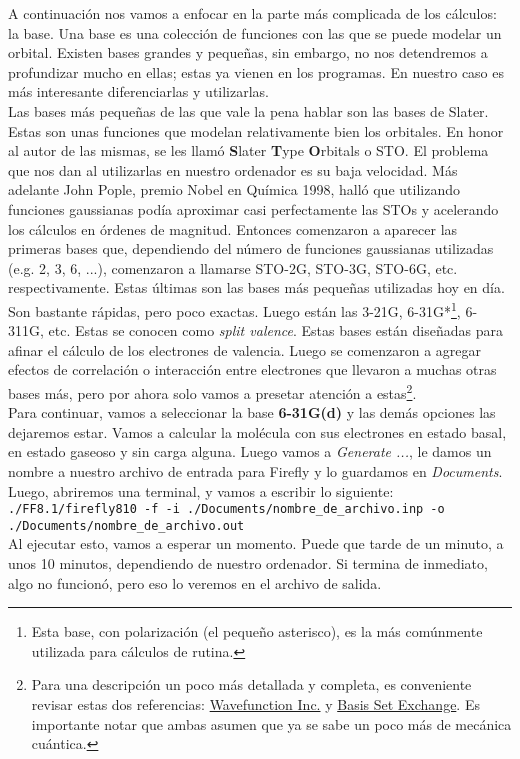 \documentclass[10pt,letterpaper]{article}
\newcommand{\inlinecode}[1]{
\colorbox{light-gray}{\texttt{#1}}
}
\begin{document}
A continuaci\'on nos vamos a enfocar en la parte m\'as complicada de los c\'alculos: la base. Una base es una colecci\'on de funciones con las que se puede modelar un orbital. Existen bases grandes y peque\~nas, sin embargo, no nos detendremos a profundizar mucho en ellas; estas ya vienen en los programas. En nuestro caso es m\'as interesante diferenciarlas y utilizarlas.\\

Las bases m\'as peque\~nas de las que vale la pena hablar son las bases de Slater. Estas son unas funciones que modelan relativamente bien los orbitales. En honor al autor de las mismas, se les llam\'o \textbf{S}later \textbf{T}ype \textbf{O}rbitals o STO. El problema que nos dan al utilizarlas en nuestro ordenador es su baja velocidad. M\'as adelante John Pople, premio Nobel en Qu\'imica 1998, hall\'o que utilizando funciones gaussianas pod\'ia aproximar casi perfectamente las STOs y acelerando los c\'alculos en \'ordenes de magnitud. Entonces comenzaron a aparecer las primeras bases que, dependiendo del n\'umero de funciones gaussianas utilizadas (e.g. 2, 3, 6, ...), comenzaron a llamarse STO-2G, STO-3G, STO-6G, etc. respectivamente. Estas \'ultimas son las bases m\'as peque\~nas utilizadas hoy en d\'ia. Son bastante r\'apidas, pero poco exactas. Luego est\'an las 3-21G, 6-31G*\footnote{Esta base, con polarizaci\'on (el peque\~no asterisco), es la m\'as com\'unmente utilizada para c\'alculos de rutina.}, 6-311G, etc. Estas se conocen como \emph{split valence}. Estas bases est\'an dise\~nadas para afinar el c\'alculo de los electrones de valencia. Luego se comenzaron a agregar efectos de correlaci\'on o interacci\'on entre electrones que llevaron a muchas otras bases m\'as, pero por ahora solo vamos a presetar atenci\'on a estas\footnote{Para una descripci\'on un poco m\'as detallada y completa, es conveniente revisar estas dos referencias: \href{https://www.wavefun.com/support/sp_compfaq/Basis_Set_FAQ.html}{Wavefunction Inc.} y \href{https://bse.pnl.gov/bse/portal}{Basis Set Exchange}. Es importante notar que ambas asumen que ya se sabe un poco m\'as de mec\'anica cu\'antica.}.\\

Para continuar, vamos a seleccionar la base \textbf{6-31G(d)} y las dem\'as opciones las dejaremos estar. Vamos a calcular la mol\'ecula con sus electrones en estado basal, en estado gaseoso y sin carga alguna. Luego vamos a \textit{Generate ...}, le damos un nombre a nuestro archivo de entrada para Firefly y lo guardamos en \textit{Documents}. Luego, abriremos una terminal, y vamos a escribir lo siguiente:\\
\inlinecode{./FF8.1/firefly810 -f -i ./Documents/nombre\_de\_archivo.inp -o ./Documents/nombre\_de\_archivo.out}\\
Al ejecutar esto, vamos a esperar un momento. Puede que tarde de un minuto, a unos 10 minutos, dependiendo de nuestro ordenador. Si termina de inmediato, algo no funcion\'o, pero eso lo veremos en el archivo de salida.\\
\end{document}
